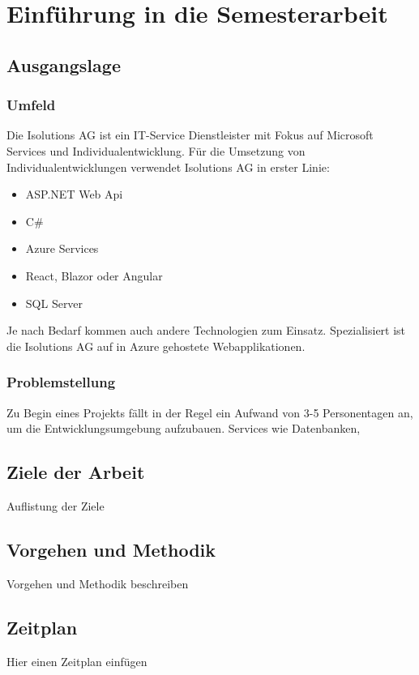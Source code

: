 \section{Einführung in die Semesterarbeit}
    \subsection{Ausgangslage}
        \subsubsection{Umfeld}
            Die Isolutions AG ist ein IT-Service Dienstleister mit Fokus auf Microsoft Services und Individualentwicklung. Für die Umsetzung von Individualentwicklungen verwendet Isolutions AG in erster Linie:
            \begin{itemize}
                \item ASP.NET Web Api
                \item C\#
                \item Azure Services
                \item React, Blazor oder Angular
                \item SQL Server
            \end{itemize}
            Je nach Bedarf kommen auch andere Technologien zum Einsatz. Spezialisiert ist die Isolutions AG auf in Azure gehostete Webapplikationen.

        \subsubsection{Problemstellung}
            Zu Begin eines Projekts fällt in der Regel ein Aufwand von 3-5 Personentagen an, um die Entwicklungsumgebung aufzubauen. Services wie Datenbanken,

\subsection{Ziele der Arbeit}
Auflistung der Ziele

\subsection{Vorgehen und Methodik}
Vorgehen und Methodik beschreiben

\subsection{Zeitplan}
Hier einen Zeitplan einfügen
